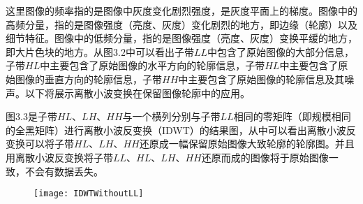%

这里图像的频率指的是图像中灰度变化剧烈强度，是灰度平面上的梯度。图像中的高频分量，指的是图像强度（亮度、灰度）变化剧烈的地方，即边缘（轮廓）以及细节特征。图像中的低频分量，指的是图像强度（亮度、灰度）变换平缓的地方，即大片色块的地方。从图$3.2$中可以看出子带$LL$中包含了原始图像的大部分信息，子带$HL$中主要包含了原始图像的水平方向的轮廓信息，子带$HL$中主要包含了原始图像的垂直方向的轮廓信息，子带$HH$中主要包含了原始图像的轮廓信息及其噪声。以下将展示离散小波变换在保留图像轮廓中的应用。

图$3.3$是子带$HL$、$LH$、$HH$与一个横列分别与子带$LL$相同的零矩阵（即规模相同的全黑矩阵）进行离散小波反变换（IDWT）的结果图，从中可以看出离散小波反变换可以将子带$HL$、$LH$、$HH$还原成一幅保留原始图像大致轮廓的轮廓图。并且用离散小波反变换将子带$LL$、$HL$、$LH$、$HH$还原而成的图像将于原始图像一致，不会有数据丢失。

\begin{figure}[!htbp]
    \centering
    \texttt{[image: IDWTWithoutLL]}
    \label{fig:tc_q_criteria}
\end{figure}



